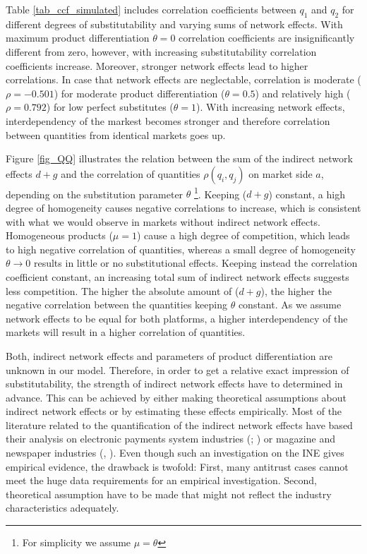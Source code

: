 \documentclass[12pt,a4paper,notitlepage]{article}
\begin{document}
Table \ref{tab_ccf_simulated} includes correlation coefficients between $q_1$ and $q_2$ for different degrees of substitutability and varying sums of network effects. With maximum product differentiation $\theta=0$ correlation coefficients are insignificantly different from zero, however, with increasing substitutability correlation coefficients increase. Moreover, stronger network effects lead to higher correlations. In case that network effects are neglectable, correlation is moderate ($\rho=-0.501$) for moderate product differentiation ($\theta=0.5$) and relatively high ($\rho=0.792$) for low perfect substitutes ($\theta=1$). With increasing network effects, interdependency of the markest becomes stronger and therefore correlation between quantities from identical markets goes up. 

Figure \ref{fig_QQ} illustrates the relation between the sum of the indirect network effects $d+g$ and the correlation of quantities $\rho(q_i,q_j)$ on market side $a$, depending on the substitution parameter $\theta$ \footnote{For simplicity we assume $\mu=\theta$}. Keeping ($d+g$) constant, a high degree of homogeneity causes negative correlations to increase, which is consistent with what we would observe in markets without indirect network effects. Homogeneous products ($\mu=1$) cause a high degree of competition, which leads to high negative correlation of quantities, whereas a small degree of homogeneity $\theta \to 0$ results in little or no substitutional effects. Keeping instead the correlation coefficient constant, an increasing total sum of indirect network effects suggests less competition. The higher the absolute amount of ($d+g$), the higher the negative correlation between the quantities keeping $\theta$ constant. As we assume network effects to be equal for both platforms, a higher interdependency of the markets will result in a higher correlation of quantities. 

Both, indirect network effects and parameters of product differentiation are unknown in our model. Therefore, in order to get a relative exact impression of substitutability, the strength of indirect network effects have to determined in advance. This can be achieved by either making theoretical assumptions about indirect network effects or by estimating these effects empirically. Most of the literature related to the quantification of the indirect network effects have based their analysis on electronic payments system industries (\cite{ackerberg_quantifying_2006}; \cite{rysman_empirical_2007}) or magazine and newspaper industries (\cite{kaiser_price_2006}, \cite{argentesi_estimating_2007}). Even though such an investigation on the INE gives empirical evidence, the drawback is twofold: First, many antitrust cases cannot meet the huge data requirements for an empirical investigation. Second, theoretical assumption have to be made that might not reflect the industry characteristics adequately. 
\end{document}
